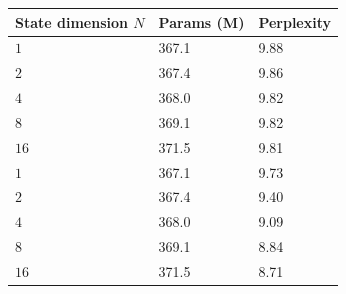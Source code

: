 \begin{tabular}{lll}
\hline
\textbf{State dimension $N$} & \textbf{Params (M)} & \textbf{Perplexity} \\
\hline
\textbf{$1$} & 367.1 & 9.88 \\
\textbf{$2$} & 367.4 & 9.86 \\
\textbf{$4$} & 368.0 & 9.82 \\
\textbf{$8$} & 369.1 & 9.82 \\
\textbf{$16$} & 371.5 & 9.81 \\
\hline
\textbf{$1$} & 367.1 & 9.73 \\
\textbf{$2$} & 367.4 & 9.40 \\
\textbf{$4$} & 368.0 & 9.09 \\
\textbf{$8$} & 369.1 & 8.84 \\
\textbf{$16$} & 371.5 & 8.71 \\
\hline
\end{tabular}
